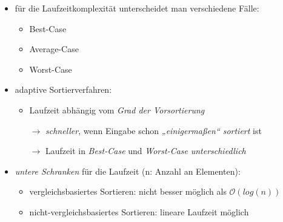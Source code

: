 \documentclass{lehramt-informatik-haupt}
\begin{document}
 \cite[Seite 38]{aud:fs:tafeluebung-11}

\begin{itemize}

%

\item für die Laufzeitkomplexität unterscheidet man verschiedene Fälle:

\begin{itemize}
\item Best-Case
\item Average-Case
\item Worst-Case
\end{itemize}

%

\item adaptive Sortierverfahren:

\begin{itemize}
\item Laufzeit abhängig vom \emph{Grad der Vorsortierung}

$\rightarrow$ \emph{schneller}, wenn Eingabe schon \emph{„einigermaßen“
sortiert} ist

$\rightarrow$ Laufzeit in \emph{Best-Case} und \emph{Worst-Case}
\emph{unterschiedlich}

\end{itemize}

%

\item \emph{untere Schranken} für die Laufzeit (n: Anzahl an Elementen):

\begin{itemize}
\item vergleichsbasiertes Sortieren: nicht besser möglich als
$\mathcal{O}(log(n))$
\item nicht-vergleichsbasiertes Sortieren: lineare Laufzeit möglich
\end{itemize}

\end{itemize}

\literatur
\end{document}
